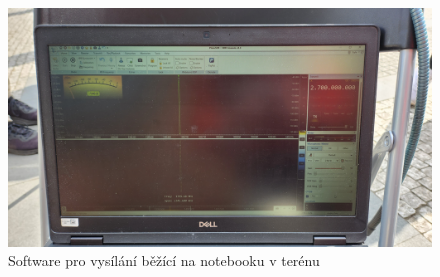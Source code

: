 \begin{figure}[h!]
    \centering
    \includegraphics[scale=0.075]{img/notebook.jpg}
    \caption{Software pro vysílání běžící na notebooku v terénu}
    \label{fig:my_label}
\end{figure}

